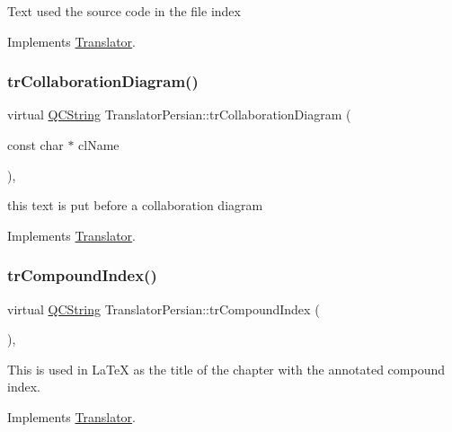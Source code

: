 Text used the source code in the file index 

Implements \mbox{\hyperlink{class_translator}{Translator}}.

\mbox{\label{class_translator_persian_af7fccabefc301760c7d7e7479d9ecd7b}} 
\subsubsection{\texorpdfstring{trCollaborationDiagram()}{trCollaborationDiagram()}}
{\footnotesize\ttfamily virtual \mbox{\hyperlink{class_q_c_string}{Q\+C\+String}} Translator\+Persian\+::tr\+Collaboration\+Diagram (\begin{DoxyParamCaption}\item[{const char $\ast$}]{cl\+Name }\end{DoxyParamCaption})\hspace{0.3cm}{\ttfamily [inline]}, {\ttfamily [virtual]}}

this text is put before a collaboration diagram 

Implements \mbox{\hyperlink{class_translator}{Translator}}.

\mbox{\label{class_translator_persian_a37e231221641621d2ce1e979ea0159da}} 
\subsubsection{\texorpdfstring{trCompoundIndex()}{trCompoundIndex()}}
{\footnotesize\ttfamily virtual \mbox{\hyperlink{class_q_c_string}{Q\+C\+String}} Translator\+Persian\+::tr\+Compound\+Index (\begin{DoxyParamCaption}{ }\end{DoxyParamCaption})\hspace{0.3cm}{\ttfamily [inline]}, {\ttfamily [virtual]}}

This is used in La\+TeX as the title of the chapter with the annotated compound index. 

Implements \mbox{\hyperlink{class_translator}{Translator}}.

\mbox{\label{class_translator_persian_a3d25b819fccf3b163af85f46cb024939}} 
